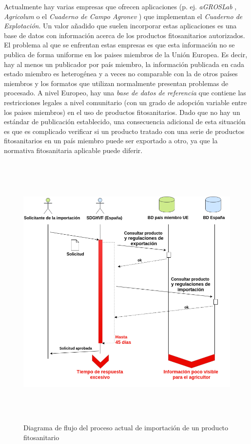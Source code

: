 Actualmente hay varias empresas que ofrecen aplicaciones (p. ej. \textit{aGROSLab} \cite{agroslab}, \textit{Agricolum} \cite{agricolum} o el \textit{Cuaderno de Campo Agronev} \cite{agronev}) que implementan el \textit{Cuaderno de Explotación}. Un valor añadido que suelen incorporar estas aplicaciones es una base de datos con información acerca de los productos fitosanitarios autorizados. El problema al que se enfrentan estas empresas es que esta información no se publica de forma uniforme en los paises miembros de la Unión Europea. Es decir, hay al menos un publicador por país miembro, la información publicada en cada estado miembro es heterogénea y a veces no comparable con la de otros países miembros y los formatos que utilizan normalmente presentan problemas de procesado. A nivel Europeo, hay una \textit{base de datos de referencia} \cite{pesticidesdb} que contiene las restricciones legales a nivel comunitario (con un grado de adopción variable entre los paises miembros) en el uso de productos fitosanitarios. Dado que no hay un estándar de publicación establecido, una consecuencia adicional de esta situación es que es complicado verificar si un producto tratado con una serie de productos fitosanitarios en un país miembro puede ser exportado a otro, ya que la normativa fitosanitaria aplicable puede diferir.

\begin{figure}[!b]
    \centering
    \includegraphics[width=1\textwidth,height=14cm]{Imagenes/Diagrama_de_flujo_proceso_actual_de_importacion_producto_fitosanitario}
    \caption{Diagrama de flujo del proceso actual de importación de un producto fitosanitario}
    \label{fig:flujo_actual_importacion}
\end{figure}


